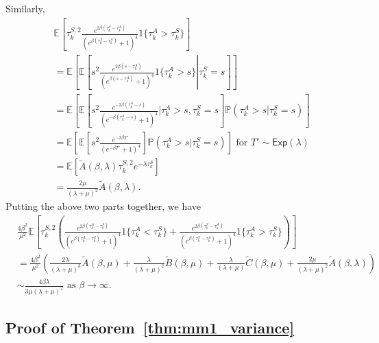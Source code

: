 Similarly,
\begin{align*}
 & \mathbb{E}\left[\tau_k^{S,2}\frac{e^{2\beta(\tau_k^S-\tau_k^A)}}{\left(e^{\beta(\tau_k^S-\tau_k^A)}+1\right)^{4}}1\{\tau_k^A>\tau_k^S\}\right]\\
 & =\mathbb{E}\left[\mathbb{E}\left[\left.s^{2}\frac{e^{2\beta(s-\tau_k^A)}}{\left(e^{\beta(s-\tau_k^A)}+1\right)^{4}}1\{\tau_k^A>s\}\right|\tau_k^S=s\right]\right]\\
 & =\mathbb{E}\left[\mathbb{E}\left[s^{2}\frac{e^{-2\beta(\tau_k^A-s)}}{(e^{-\beta(\tau_k^A-s)}+1)^{4}}|\tau_k^A>s,\tau_k^S=s\right]\mathbb{P}(\tau_k^A>s|\tau_k^S=s)\right]\\
 & =\mathbb{E}\left[\mathbb{E}\left[s^{2}\frac{e^{-2\beta T'}}{(e^{-\beta T'}+1)^{4}}\right]\mathbb{P}(\tau_k^A>s|\tau_k^S=s)\right] \mbox{ for $T'\sim \mathsf{Exp}(\lambda)$}\\
 & =\mathbb{E}\left[\tilde{A}(\beta,\lambda)\tau_k^{S,2}e^{-\lambda \tau_k^S}\right]\\
 & =\frac{2\mu}{(\lambda+\mu)^{2}}\tilde{A}(\beta,\lambda).
\end{align*}
Putting the above two parts together, we have
\begin{align*}
 &\frac{4\beta^{2}}{\mu^{2}}\mathbb{E}\left[\tau_k^{S,2}\left(\frac{e^{2\beta(\tau_k^A-\tau_k^S)}}{\left(e^{\beta(\tau_k^A-\tau_k^S)}+1\right)^{4}}1\{\tau_k^A<\tau_k^S\}+\frac{e^{2\beta(\tau_k^S-\tau_k^A)}}{\left(e^{\beta(\tau_k^S-\tau_k^A)}+1\right)^{4}}1\{\tau_k^A>\tau_k^S\}\right)\right]\\
 & =\frac{4\beta^{2}}{\mu^{2}}\left(\frac{2\lambda}{(\lambda+\mu)^{3}}\tilde{A}(\beta,\mu)+\frac{\lambda}{(\lambda+\mu)^{2}}\tilde{B}(\beta,\mu)+\frac{\lambda}{(\lambda+\mu)}\tilde{C}(\beta,\mu)+\frac{2\mu}{(\lambda+\mu)^{2}}\tilde{A}(\beta,\lambda)\right)\\
 & \sim\frac{4\beta\lambda}{3\mu(\lambda+\mu)^{2}} \mbox{ as $\beta\to\infty$.}
\end{align*}


\subsection{Proof of Theorem~\ref{thm:mm1_variance}}
\label{sec:proof_mm1_variance}

